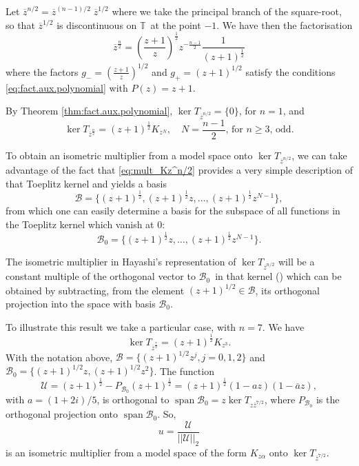 \documentclass[12pt]{elsarticle}
\numberwithin{equation}{section}
\theoremstyle{plain}
\newcommand{\TT}{\ensuremath{\mathbb{T}}}
\newcommand{\BB}{\ensuremath{\mathcal{B}}}
\newcommand{\BBo}{\ensuremath{{\mathcal{B}_0}}}
\newcommand{\UU}{\ensuremath{\mathcal{U}}}
\newcommand{\ol}[1]{\ensuremath{\overline{#1}}}
\newcommand{\zero}{\ensuremath{\{0\}}}
\newcommand{\spn}{\ensuremath{\operatorname{span}}}
\begin{document}
Let $\ol z^{n/2} = \ol z^{(n-1)/2} \; \ol z^{1/2}$ where we take the principal branch of the square-root, so that $\ol z^{1/2}$ is discontinuous on \TT\ at the point $-1$.
We have then the factorisation
\begin{equation}
\label{eq:z^n/2_fact_aux_polyn}
\ol z^\frac{n}{2} = \left( \frac{z+1}{z} \right)^\frac{1}{2} z^{-\frac{n-1}{2}} \frac{1}{(z+1)^\frac{1}{2}}
\end{equation}
where the factors $g_- = \left( \frac{z+1}{z} \right)^{1/2}$ and $g_+ = (z+1)^{1/2}$ satisfy the conditions \eqref{eq:fact.aux.polynomial} with $P(z) = z+1$.

By Theorem \ref{thm:fact.aux.polynomial}, $\ker T_{\ol z^{n/2}} = \zero$, for $n=1$, and
\begin{equation}
\label{eq:mult_Kz^n/2}
\ker T_{\ol z^\frac{n}{2}} = (z+1)^\frac{1}{2} K_{z^N}, \quad N= \frac{n-1}{2} \text{, for } n \geq 3 \text{, odd}.
\end{equation}

To obtain an isometric multiplier from a model space onto $\ker T_{\ol z^{n/2}}$, we can take advantage of the fact that \eqref{eq:mult_Kz^n/2} provides a very simple description of that Toeplitz kernel and yields a basis
\begin{equation}
\BB = \{ (z+1)^\frac{1}{2}, (z+1)^\frac{1}{2} z, \dots , (z+1)^\frac{1}{2} z^{N-1} \},
\end{equation}
from which one can easily determine a basis for the subspace of all functions in the Toeplitz kernel which vanish at $0$:
\begin{equation}
\BBo = \{ (z+1)^\frac{1}{2} z, \dots , (z+1)^\frac{1}{2} z^{N-1} \}.
\end{equation}


The isometric multiplier in Hayashi's representation of $\ker T_{\ol z^{n/2}}$ will be a constant multiple of the orthogonal vector to \BBo\ in that kernel (\cite{Sa94}) which can be obtained by subtracting, from the element $(z+1)^{1/2} \in\BB$, its orthogonal projection into the space with basis \BBo.


To illustrate this result we take a particular case, with $n=7$.
We have
\begin{equation}
\label{eq:mult_Kz^7/2}
\ker T_{\ol z^\frac{7}{2}} = (z+1)^\frac{1}{2} K_{z^3}.
\end{equation}
With the notation above, $\BB = \{ (z+1)^{1/2} z^j, j=0,1,2 \}$ and $\BBo = \{ (z+1)^{1/2} z, (z+1)^{1/2} z^2 \}$.
The function
\begin{equation*}
\UU = (z+1)^\frac{1}{2} - P_\BBo (z+1)^\frac{1}{2} = (z+1)^\frac{1}{2} (1 - a z) (1 - \ol a z),
\end{equation*}
with $a = (1 + 2 i)/5$, is orthogonal to $\spn\BBo = z \ker T_{z \ol z^{7/2}}$, where $P_\BBo$ is the orthogonal projection onto $\spn\BBo$.
So,
\[
u = \frac{\UU}{||\UU||_2}
\]
is an isometric multiplier from a model space of the form $K_{z \alpha}$ onto $\ker T_{\ol z^{7/2}}$.
\end{document}
